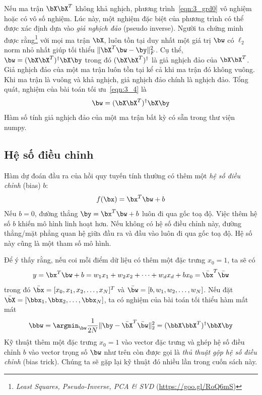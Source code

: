 {Nếu ma trận $\bX\bX^T$ không khả nghịch}, phương trình~\eqref{eqn:3_grd0} vô
nghiệm hoặc có vô số nghiệm. Lúc này, một nghiệm đặc biệt của phương trình có
thể được xác định dựa vào \textit{giả nghịch đảo} (pseudo inverse). Người ta chứng minh được
rằng\footnote{\textit{Least Squares, Pseudo-Inverse, PCA \& SVD}
(\url{https://goo.gl/RoQ6mS})} với mọi ma trận $\bX$, luôn tồn tại duy nhất một
giá trị $\bw$ có $\ell_2$ norm nhỏ nhất giúp tối thiểu $\|\bX^T\bw - \by\|_F^2$.
Cụ thể, $\bw = (\bX\bX^T)^{\dagger}\bX\by$ trong đó $(\bX\bX^T)^{\dagger}$ là
giả nghịch đảo của $\bX\bX^T$. Giả nghịch đảo của một ma trận luôn
tồn tại kể cả khi ma trận đó không vuông. Khi ma trận là vuông và khả
nghịch, giả nghịch đảo chính là nghịch đảo. Tổng quát, nghiệm của bài toán tối
ưu~\eqref{eqn:3_4} là
\begin{equation}
    \bw = (\bX\bX^T)^{\dagger}\bX\by
\end{equation}
Hàm số tính giả nghịch đảo của một ma trận bất kỳ có sẵn trong thư viện numpy. 

\subsection{Hệ số điều chỉnh}
\label{ssec:3_biastrick}
Hàm dự đoán đầu ra của hồi quy tuyến tính thường có thêm một \textit{hệ số điều chỉnh} (bias) $b$:
\begin{equation}
    f(\bx) = \bx^T\bw + b 
\end{equation}
Nếu $b = 0$, đường thẳng $\by = \bx^T\bw + b$ luôn đi qua gốc toạ độ. Việc thêm
hệ số $b$ khiến mô hình linh hoạt hơn. Nếu không có hệ số điều chỉnh này, đường thẳng/mặt
phẳng quan hệ giữa đầu ra và đầu vào luôn đi qua gốc toạ độ. Hệ số này cũng là một tham số mô hình.


Để ý thấy rằng, nếu coi mỗi điểm dữ liệu có thêm một đặc trưng $x_0 = 1$, ta sẽ có
\begin{equation}
    y = \bx^T\bw + b = w_1x_1 + w_2x_2 + \dots + w_dx_d + bx_0 =
    \bar{\bx}^T\bar{\bw}
\end{equation}
trong đó $\bar{\bx} = [x_0, x_1, x_2, \dots, x_N]^T$ và $\bar{\bw} = [b, w_1,
w_2, \dots, w_N]$. Nếu đặt $\bar{\bX} = [\bbx_1, \bbx_2, \dots, \bbx_N]$, ta có nghiệm của bài toán tối thiểu hàm mất mát
\begin{equation}
\label{eqn:3_finalsolution}
    \bbw = \argmin_{\bw} \frac{1}{2N}\|\by - \bar{\bX}^T\bar{\bw}\|_2^2 = (\bbX
    \bbX^T)^{\dagger} \bbX\by
\end{equation}
Kỹ thuật thêm một đặc trưng $x_0 = 1$ vào vector đặc trưng và ghép hệ số điều chỉnh $b$ vào
vector trọng số $\bw$ như trên còn được gọi là \textit{thủ thuật gộp hệ số điều chỉnh} (bias trick). Chúng ta sẽ
gặp lại kỹ thuật đó nhiều lần trong cuốn sách này. 


